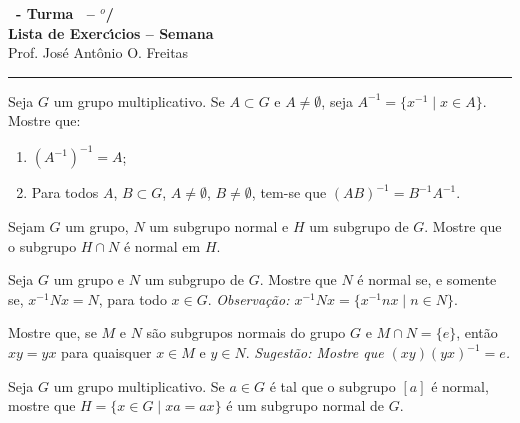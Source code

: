 \documentclass[12pt]{exam}
\begin{document}
\begin{center}
    
    {\Large\bf \disciplina\ - Turma \turma\ -- \semestre$^{o}$/\ano} \\ \vspace{9pt} {\large\bf
        Lista de Exerc{\'\i}cios -- Semana \numerosemana}\\ \vspace{9pt} Prof. Jos{\'e} Ant{\^o}nio O. Freitas
    \end{center}
    \hrule

    \vspace{.6cm}

    \questao{} Seja $G$ um grupo multiplicativo. Se $A \subset G$ e $A \ne \emptyset$, seja $A^{-1} = \{x^{-1} \mid x \in A\}$. Mostre que:
    \begin{enumerate}[label=({\alph*})]
      \item $(A^{-1})^{-1} = A$;

      \item Para todos $A$, $B \subset G$, $A \ne \emptyset$, $B \ne \emptyset$, tem-se que $(AB)^{-1} = B^{-1}A^{-1}$.
    \end{enumerate}
    
    \vspace{.3cm}

    \questao{} Sejam $G$ um grupo, $N$ um subgrupo normal e $H$ um subgrupo de $G$. Mostre que o subgrupo $H \cap N$ \'e normal em $H$.

    \vspace{.3cm}

    \questao{} Seja $G$ um grupo e $N$ um subgrupo de $G$. Mostre que $N$ \'e normal se, e somente se, $x^{-1}Nx = N$, para todo $x \in G$.
    \noindent\textit{Observa\c{c}\~ao: $x^{-1}Nx = \{x^{-1}nx \mid n \in N\}$}.

    \vspace{.3cm}

    \questao{} Mostre que, se $M$ e $N$ s\~ao subgrupos normais do grupo $G$ e $M \cap N = \{e\}$, ent\~ao $xy = yx$ para quaisquer $x \in M$ e $y \in N$.
    \noindent \textit{Sugest\~ao: Mostre que $(xy)(yx)^{-1} = e$.}

    \vspace{.3cm}

    \questao{} Seja $G$ um grupo multiplicativo. Se $a \in G$ é tal que o subgrupo $[a]$ é normal, mostre que $H = \{x \in G \mid xa = ax\}$ \'e um subgrupo normal de $G$.

    \vspace{.3cm}
\end{document}
